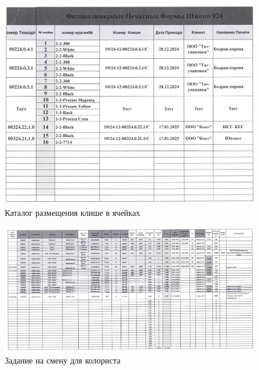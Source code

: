 \begin{figure}
\begin{center}
 \includegraphics[width=\linewidth, height=0.94\textheight, keepaspectratio]{Pics/f22.jpg}
\end{center}
\caption{Каталог размещения клише в ячейках}
\label{pic:f22}
\end{figure}

\begin{figure}
\begin{center}
 \includegraphics[width=\linewidth, height=0.94\textheight, angle=90, keepaspectratio]{Pics/f18.jpg}
\end{center}
\caption{Задание на смену для колориста}
\label{pic:f18}
\end{figure}

